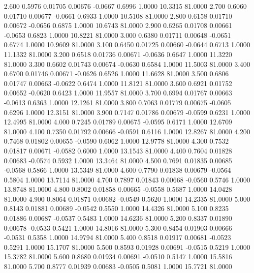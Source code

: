    2.600   0.5976   0.01705   0.00676  -0.0667   0.6996   1.0000  10.3315  81.0000
   2.700   0.6060   0.01710   0.00677  -0.0661   0.6933   1.0000  10.5108  81.0000
   2.800   0.6158   0.01710   0.00672  -0.0656   0.6875   1.0000  10.6743  81.0000
   2.900   0.6265   0.01708   0.00661  -0.0653   0.6823   1.0000  10.8221  81.0000
   3.000   0.6380   0.01711   0.00648  -0.0651   0.6774   1.0000  10.9609  81.0000
   3.100   0.6450   0.01725   0.00660  -0.0644   0.6713   1.0000  11.1332  81.0000
   3.200   0.6518   0.01736   0.00671  -0.0636   0.6647   1.0000  11.3220  81.0000
   3.300   0.6602   0.01743   0.00674  -0.0630   0.6584   1.0000  11.5003  81.0000
   3.400   0.6700   0.01746   0.00671  -0.0626   0.6526   1.0000  11.6628  81.0000
   3.500   0.6806   0.01747   0.00663  -0.0622   0.6474   1.0000  11.8121  81.0000
   3.600   0.6921   0.01752   0.00652  -0.0620   0.6423   1.0000  11.9557  81.0000
   3.700   0.6994   0.01767   0.00663  -0.0613   0.6363   1.0000  12.1261  81.0000
   3.800   0.7063   0.01779   0.00675  -0.0605   0.6296   1.0000  12.3151  81.0000
   3.900   0.7147   0.01786   0.00679  -0.0599   0.6231   1.0000  12.4995  81.0000
   4.000   0.7245   0.01789   0.00675  -0.0595   0.6171   1.0000  12.6709  81.0000
   4.100   0.7350   0.01792   0.00666  -0.0591   0.6116   1.0000  12.8267  81.0000
   4.200   0.7468   0.01802   0.00655  -0.0590   0.6062   1.0000  12.9778  81.0000
   4.300   0.7532   0.01817   0.00671  -0.0582   0.6000   1.0000  13.1543  81.0000
   4.400   0.7604   0.01828   0.00683  -0.0574   0.5932   1.0000  13.3464  81.0000
   4.500   0.7691   0.01835   0.00685  -0.0568   0.5866   1.0000  13.5349  81.0000
   4.600   0.7790   0.01838   0.00679  -0.0564   0.5804   1.0000  13.7114  81.0000
   4.700   0.7897   0.01843   0.00668  -0.0560   0.5746   1.0000  13.8748  81.0000
   4.800   0.8002   0.01858   0.00665  -0.0558   0.5687   1.0000  14.0428  81.0000
   4.900   0.8064   0.01871   0.00682  -0.0549   0.5620   1.0000  14.2335  81.0000
   5.000   0.8143   0.01881   0.00689  -0.0542   0.5550   1.0000  14.4326  81.0000
   5.100   0.8235   0.01886   0.00687  -0.0537   0.5483   1.0000  14.6236  81.0000
   5.200   0.8337   0.01890   0.00678  -0.0533   0.5421   1.0000  14.8016  81.0000
   5.300   0.8454   0.01903   0.00666  -0.0531   0.5358   1.0000  14.9794  81.0000
   5.400   0.8518   0.01917   0.00681  -0.0523   0.5291   1.0000  15.1707  81.0000
   5.500   0.8593   0.01928   0.00691  -0.0515   0.5219   1.0000  15.3782  81.0000
   5.600   0.8680   0.01934   0.00691  -0.0510   0.5147   1.0000  15.5816  81.0000
   5.700   0.8777   0.01939   0.00683  -0.0505   0.5081   1.0000  15.7721  81.0000
